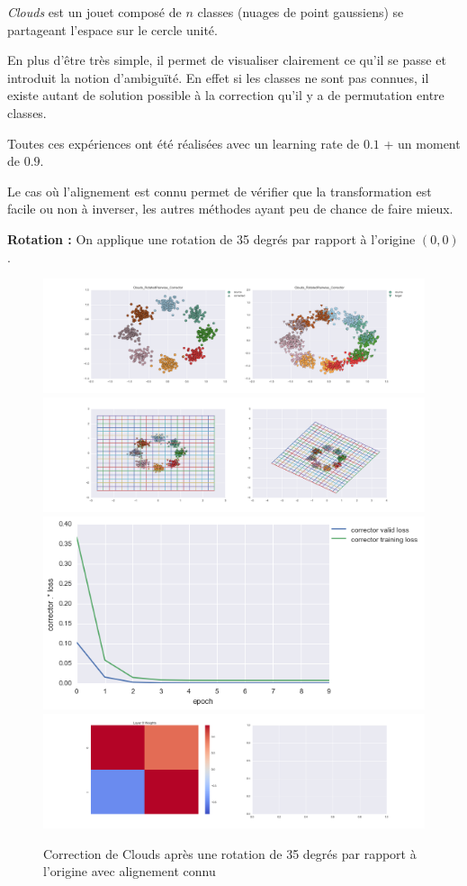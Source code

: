 \emph{Clouds} est un jouet composé de $n$ classes (nuages de point gaussiens) se partageant 
l'espace sur le cercle unité.

En plus d'être très simple, il permet de visualiser clairement ce qu'il se passe et introduit
la notion d'ambiguïté. En effet si les classes ne sont pas connues, il existe autant de solution
possible à la correction qu'il y a de permutation entre classes.


Toutes ces expériences ont été réalisées avec un learning rate de $0.1$ + un moment de $0.9$.

Le cas où l'alignement est connu permet de vérifier que la transformation est facile ou non 
à inverser, les autres méthodes ayant peu de chance de faire mieux.

{\Large \textbf{Rotation :}}  On applique une rotation de 35 degrés par rapport à l'origine $(0,0)$.

\begin{figure}[H] %
\centering
\includegraphics[width=\linewidth]{fig/24-05-2016/clouds/Clouds_RotatedPairwise_Corrector-DATA.png}
\includegraphics[width=\linewidth]{fig/24-05-2016/clouds/Clouds_RotatedPairwise_Corrector-GridCheck.png}
\includegraphics[width=0.45\linewidth]{fig/24-05-2016/clouds/Clouds_RotatedPairwise_Corrector-Learning_curve.png}
\includegraphics[width=\linewidth]{fig/24-05-2016/clouds/Clouds_RotatedPairwise_Corrector-W.png}
\caption{Correction de Clouds après une rotation de 35 degrés par rapport à l'origine avec alignement connu}
\label{fig:recap-clouds-rot-pairwise}
\end{figure}

